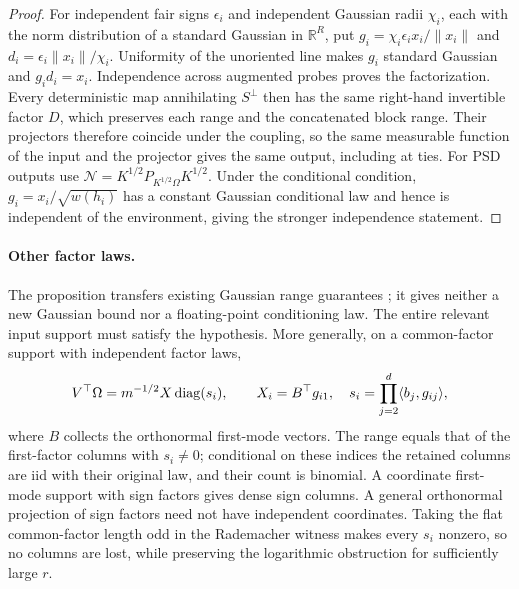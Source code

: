 \documentclass[11pt,a4paper]{article}
\theoremstyle{definition}\newtheorem{definition}[theorem]{Definition}
\theoremstyle{remark}\newtheorem{remark}[theorem]{Remark}
\numberwithin{equation}{section}
\newcommand{\R}{\mathbb R}\newcommand{\E}{\mathbb E}\newcommand{\Pp}{\mathbb P}
\newcommand{\norm}[1]{\lVert#1\rVert}\newcommand{\ip}[2]{\langle#1,#2\rangle}
\begin{document}
\begin{proof}
For independent fair signs $\epsilon_i$ and independent Gaussian radii
$\chi_i$, each with the norm distribution of a standard Gaussian in
$\R^R$, put $g_i=\chi_i\epsilon_i x_i/\norm{x_i}$ and
$d_i=\epsilon_i\norm{x_i}/\chi_i$. Uniformity of the unoriented
line makes $g_i$ standard Gaussian and $g_id_i=x_i$.
Independence across augmented probes proves the factorization.
Every deterministic map annihilating $S^\perp$ then has the same
right-hand invertible factor $D$, which preserves each range and the
concatenated block range. Their projectors therefore coincide under
the coupling, so the same measurable function of the input and the
projector gives the same output, including at ties. For PSD outputs use
$\mathcal N=K^{1/2}P_{K^{1/2}\Omega}K^{1/2}$.
Under the conditional condition, $g_i=x_i/\sqrt{w(h_i)}$ has a
constant Gaussian conditional law and hence is independent of the
environment, giving the stronger independence statement.
\end{proof}

\paragraph{Other factor laws.}
The proposition transfers existing Gaussian range guarantees
\cite{HMT2011,MuscoMusco2015}; it gives neither a new Gaussian bound
nor a floating-point conditioning law. The entire relevant input
support must satisfy the hypothesis.
More generally, on a common-factor support with independent factor laws,
\[
 V^\top\Omega=m^{-1/2}X\diag(s_i),\qquad
 X_i=B^\top g_{i1},\quad s_i=\prod_{j=2}^d\ip{b_j}{g_{ij}},
\]
where $B$ collects the orthonormal first-mode vectors. The range equals
that of the first-factor columns with $s_i\ne0$; conditional on these
indices the retained columns are iid with their original law, and
their count is binomial. A coordinate first-mode support with sign
factors gives dense sign columns. A general orthonormal projection of
sign factors need not have independent coordinates. Taking the flat
common-factor length odd in the Rademacher witness makes every $s_i$
nonzero, so no columns are lost, while preserving the logarithmic
obstruction for sufficiently large $r$.
\end{document}
